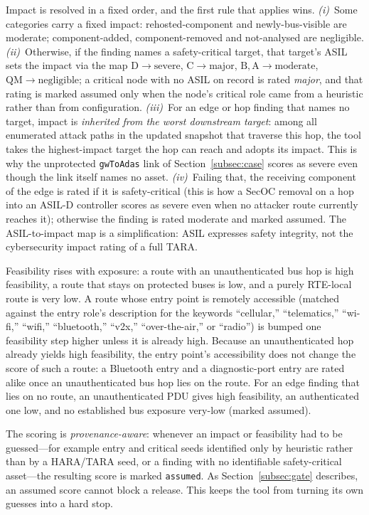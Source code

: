 \documentclass[journal]{IEEEtran}
\begin{document}
Impact is resolved in a fixed order, and the first rule that applies wins.
\emph{(i)}~Some categories carry a fixed impact: rehosted-component and
newly-bus-visible are moderate; component-added, component-removed and
not-analysed are negligible. \emph{(ii)}~Otherwise, if the finding names a
safety-critical target, that target's ASIL sets the impact via the map
$\mathrm{D}\!\to\!\text{severe}$, $\mathrm{C}\!\to\!\text{major}$,
$\mathrm{B},\mathrm{A}\!\to\!\text{moderate}$, $\mathrm{QM}\!\to\!\text{negligible}$;
a critical node with no ASIL on record is rated \emph{major}, and that rating is
marked assumed only when the node's critical role came from a heuristic rather
than from configuration. \emph{(iii)}~For an edge or hop finding that names no
target, impact is \emph{inherited from the worst downstream target}: among all
enumerated attack paths in the updated snapshot that traverse this hop, the tool
takes the highest-impact target the hop can reach and adopts its impact. This is
why the unprotected \texttt{gwToAdas} link of Section~\ref{subsec:case} scores as
severe even though the link itself names no asset. \emph{(iv)}~Failing that, the
receiving component of the edge is rated if it is safety-critical (this is how a
SecOC removal on a hop into an ASIL-D controller scores as severe even when no
attacker route currently reaches it); otherwise the finding is rated moderate and
marked assumed. The ASIL-to-impact map is a simplification: ASIL expresses
safety integrity, not the cybersecurity impact rating of a full TARA.

Feasibility rises with exposure: a route with an unauthenticated bus hop is
high feasibility, a route that stays on protected buses is low, and a purely
RTE-local route is very low. A route whose entry point is remotely accessible
(matched against the entry role's description for the keywords ``cellular,''
``telematics,'' ``wi-fi,'' ``wifi,'' ``bluetooth,'' ``v2x,'' ``over-the-air,'' or
``radio'') is bumped one feasibility step higher unless it is already high.
Because an unauthenticated hop already yields high feasibility, the entry
point's accessibility does not change the score of such a route: a Bluetooth
entry and a diagnostic-port entry are rated alike once an unauthenticated bus
hop lies on the route. For an edge finding that lies on no route, an
unauthenticated PDU gives high feasibility, an authenticated one low, and no
established bus exposure very-low (marked assumed).

The scoring is \emph{provenance-aware}: whenever an impact or feasibility had to
be guessed---for example entry and critical seeds identified only by heuristic
rather than by a HARA/TARA seed, or a finding with no identifiable
safety-critical asset---the resulting score is marked \texttt{assumed}. As
Section~\ref{subsec:gate} describes, an assumed score cannot block a release.
This keeps the tool from turning its own guesses into a hard stop.
\end{document}
